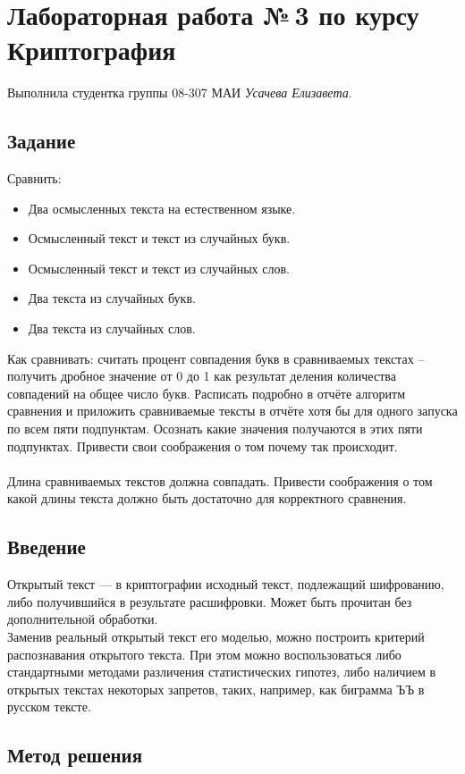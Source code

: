 \documentclass[12pt]{article}
\begin{document}
\section*{Лабораторная работа №\,3 по курсу Криптография}

Выполнила студентка группы 08-307 МАИ \textit{Усачева Елизавета}.

\subsection*{Задание}
Сравнить:
\begin{itemize}
    \item Два осмысленных текста на естественном языке.
    \item Осмысленный текст и текст из случайных букв.
    \item Осмысленный текст и текст из случайных слов.
    \item Два текста из случайных букв.
    \item Два текста из случайных слов.
\end{itemize}
Как сравнивать: считать процент совпадения букв в сравниваемых текстах – получить дробное значение от 0 до 1 как результат деления количества совпадений на общее число букв. Расписать подробно в отчёте алгоритм сравнения и приложить сравниваемые тексты в отчёте хотя бы для одного запуска по всем пяти подпунктам. Осознать какие значения получаются в этих пяти подпунктах. Привести свои соображения о том почему так происходит.\\
\\
Длина сравниваемых текстов должна совпадать. Привести соображения о том какой длины текста должно быть достаточно для корректного сравнения.

\subsection*{Введение}

Открытый текст — в криптографии исходный текст, подлежащий шифрованию, либо получившийся в результате расшифровки. Может быть прочитан без дополнительной обработки.
\\
Заменив реальный открытый текст его моделью, можно построить критерий распознавания открытого текста. При этом можно воспользоваться либо стандартными методами различения статистических гипотез, либо наличием в открытых текстах некоторых запретов, таких, например, как биграмма ЪЪ в русском тексте.

\subsection*{Метод решения}
\end{document}
